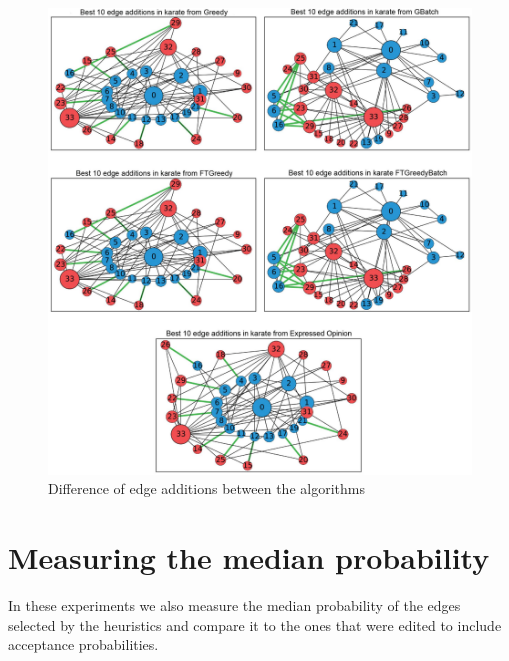 \begin{figure}[!htbp]
	\begin{center}
	\advance\leftskip-0.7cm
	\includegraphics[width=1.1\textwidth]{Figures/add6}
	\vspace{20pt}
	\caption{Difference of edge additions between the algorithms}
	\label{diff}
	\end{center}
\end{figure}
\clearpage



\section{Measuring the median probability}		
\label{sec:median}
\vspace{15pt}	
In these experiments we also measure the median probability of the edges selected by the heuristics and compare it to the ones that were edited to include acceptance probabilities.
\\


